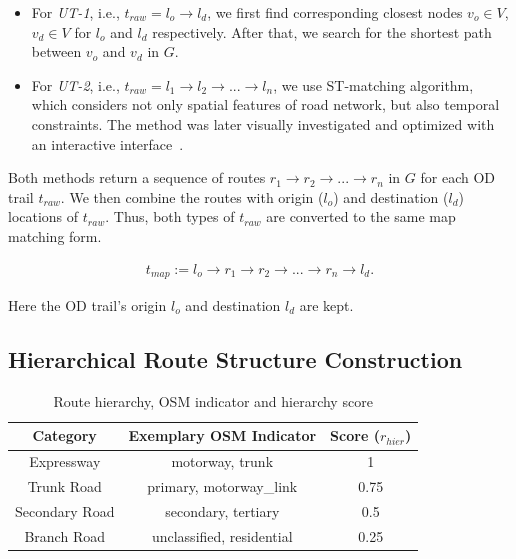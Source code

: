 \begin{itemize}

\item
For \textit{UT-1}, i.e., $t_{raw} = l_o \rightarrow l_d$, we first find corresponding closest nodes $v_o \in V$, $v_d \in V$ for $l_o$ and $l_d$ respectively.
After that, we search for the shortest path between $v_o$ and $v_d$ in $G$.

\item
For \textit{UT-2}, i.e., $t_{raw} = l_1 \rightarrow l_2 \rightarrow ... \rightarrow l_n$, we use ST-matching algorithm, which considers not only spatial features of road network, but also temporal constraints.
The method was later visually investigated and optimized with an interactive interface~\cite{kruger_2018_visual}.
\end{itemize}

Both methods return a sequence of routes $r_1 \rightarrow r_2 \rightarrow ... \rightarrow r_n$ in $G$ for each OD trail $t_{raw}$.
We then combine the routes with origin ($l_o$) and destination ($l_d$) locations of $t_{raw}$.
Thus, both types of $t_{raw}$ are converted to the same map matching form. 

\vspace{-4mm}
\begin{equation}
  	\begin{aligned}
t_{map} := l_o \rightarrow r_1 \rightarrow r_2 \rightarrow ... \rightarrow r_n \rightarrow l_d.
 	\end{aligned}
\end{equation}
\vspace{-3mm}

Here the OD trail's origin $l_o$ and destination $l_d$ are kept.

\subsection{Hierarchical Route Structure Construction}
\label{ssec:hiera_road}

\begin{table}
	\centering
	\begin{tabular}{|c|c|c|}
	\hline
	Category & Exemplary OSM Indicator & Score ($r_{hier}$)  \\ \hline
	Expressway & motorway, trunk & 1 \\ \hline
	Trunk Road & primary, motorway\_link& 0.75 \\ \hline
	Secondary Road & secondary, tertiary & 0.5 \\ \hline
	Branch Road & unclassified, residential & 0.25 \\ \hline
	\end{tabular}
	\vspace{1mm}
	\caption{Route hierarchy, OSM indicator and hierarchy score} \label{tab:sometab}
	\label{table: road_score}
\vspace{-6mm}
\end{table}

